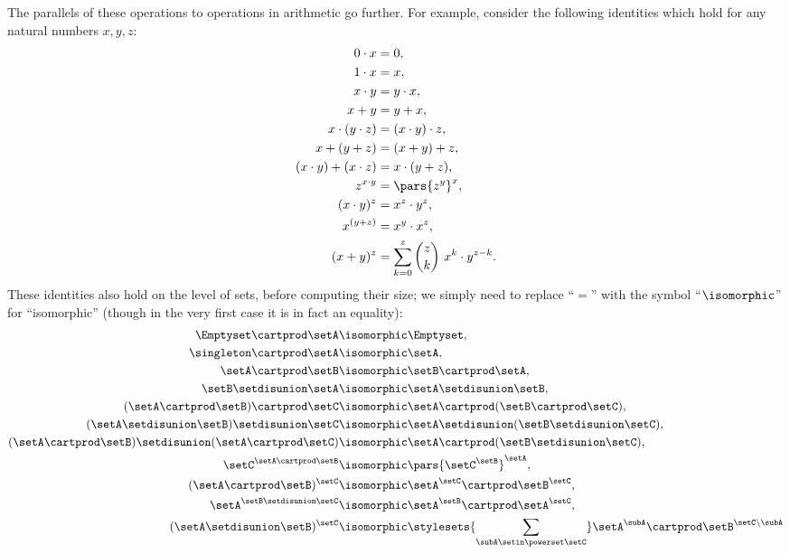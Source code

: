 The parallels of these operations to operations in arithmetic go further.
For example, consider the following identities which hold for any natural numbers $x, y, z$: 
\begin{align}
    0 \cdot x &= 0, \\
    1 \cdot x &= x, \\
    x \cdot y & = y \cdot x,  \\ 
    x + y & = y + x, \\
    x \cdot (y \cdot z) & = (x \cdot y) \cdot z, \\
    x + (y + z) & = (x + y) + z, \\
    (x \cdot y) + (x \cdot z)  & = x \cdot (y + z), \\
    z^{x \cdot y}                    & = \pars{z^y}^x, \\
    (x \cdot y)^z &= x^z \cdot y^z, \\
    x^{(y + z)}           & = x^y \cdot x^z, \\
    (x + y)^z &= \sum_{k = 0}^z {{z}\choose{k}} \ x^k \cdot y^{z - k}. 
\end{align}
These identities also hold on the level of sets, before computing their size; we simply need to replace ``$=$'' with the symbol ``$\isomorphic$'' for ``isomorphic'' (though in the very first case it is in fact an equality):
\begin{align}
    \Emptyset \cartprod \setA & \isomorphic \Emptyset,  \\
    \singleton \cartprod \setA  & \isomorphic \setA,  \\
    \setA \cartprod \setB & \isomorphic \setB \cartprod \setA,  \\
    \setB \setdisunion \setA & \isomorphic \setA \setdisunion \setB,   \\
    (\setA \cartprod \setB) \cartprod \setC & \isomorphic \setA \cartprod (\setB \cartprod \setC), \\
    (\setA \setdisunion \setB) \setdisunion \setC & \isomorphic \setA \setdisunion (\setB \setdisunion \setC), \\
    (\setA \cartprod \setB) \setdisunion (\setA \cartprod \setC)  & \isomorphic \setA \cartprod (\setB \setdisunion \setC), \\
    \setC^{\setA \cartprod \setB}                    & \isomorphic \pars{\setC^\setB}^\setA, \\
    (\setA \cartprod \setB)^{\setC} & \isomorphic  \setA^\setC \cartprod \setB^\setC, \\
    \setA^{\setB \setdisunion \setC}           & \isomorphic \setA^\setB \cartprod \setA^\setC, \\
    (\setA \setdisunion \setB)^{\setC} & \isomorphic \stylesets{\sum_{\subA \setin \powerset \setC}} \setA^\subA \cartprod \setB^{\setC \backslash \subA} 
\end{align}

